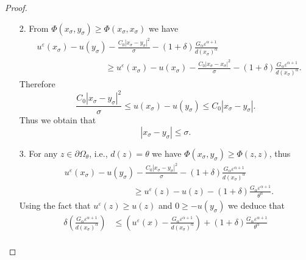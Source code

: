 \documentclass[11pt,reqno]{amsart}
\numberwithin{figure}{section}
\theoremstyle{plain}
\theoremstyle{remark}
\numberwithin{equation}{section}
\begin{document}
\begin{proof}
\begin{enumerate}
    \begin{equation*}
        \max_{\overline{\Omega}\times \overline{\Omega}} \Phi = \Phi(x_\sigma,y_\sigma).
    \end{equation*}
    We can assume that 
    \begin{equation}\label{e:ass_delta0}
        d(x_\sigma) < \delta_0
    \end{equation}
    so that $|Dd(x_\sigma)| = 1$. We will mention how the case $d(x_\sigma)\geq \delta_0$ can be easily deduced at the end of the proof.
    \item[2.] From $\Phi(x_\sigma,y_\sigma)\geq \Phi(x_\sigma,x_\sigma)$ we have
    \begin{align*}
        & u^\varepsilon(x_\sigma) - u(y_\sigma) - \frac{C_0|x_\sigma-y_\sigma |^2}{\sigma}- \left(1+\delta\right)\frac{G_\alpha\varepsilon^{\alpha+1}}{d(x_\sigma)^{\alpha}} \\
        & \qquad\qquad\qquad\qquad \geq u^\varepsilon(x_\sigma) - u(x_\sigma) - \frac{C_0|x_\sigma-x_\sigma |^2}{\sigma}- \left(1+\delta\right)\frac{G_\alpha\varepsilon^{\alpha+1}}{d(x_\sigma)^{\alpha}}.
    \end{align*}
    Therefore
    \begin{equation*}
        \frac{C_0|x_\sigma - y_\sigma|^2}{\sigma} \leq u(x_\sigma) - u(y_\sigma) \leq C_0|x_\sigma - y_\sigma|.
    \end{equation*}
    Thus we obtain that
    \begin{equation*}
        |x_\sigma - y_\sigma|\leq \sigma.
    \end{equation*}
    \item[3.] For any $z\in \partial\Omega_\theta$, i.e., $d(z) = \theta$ we have $\Phi(x_\sigma,y_\sigma)\geq \Phi(z,z)$, thus
    \begin{align*}
          & u^\varepsilon(x_\sigma) - u(y_\sigma) - \frac{C_0|x_\sigma-y_\sigma |^2}{\sigma}- \left(1+\delta\right)\frac{G_\alpha\varepsilon^{\alpha+1}}{d(x_\sigma)^{\alpha}} \\
        & \qquad\qquad\qquad\qquad \geq u^\varepsilon(z) - u(z) - \left(1+\delta\right)\frac{G_\alpha\varepsilon^{\alpha+1}}{\theta^{\alpha}}.
    \end{align*}
    Using the fact that $u^\varepsilon(z) \geq u(z)$ and $0\geq -u(y_\sigma)$ we deduce that
    \begin{align*}
        \delta\left(\frac{G_\alpha\varepsilon^{\alpha+1}}{d(x_\sigma)^{\alpha}}\right) &\leq \left(u^\varepsilon(x) - \frac{G_\alpha\varepsilon^{\alpha+1}}{d(x_\sigma)^{\alpha}}\right) + \left(1+\delta\right)\frac{G_\alpha\varepsilon^{\alpha+1}}{\theta^{\alpha}}\\

\end{align*}
\end{enumerate}
\end{proof}
\end{document}
